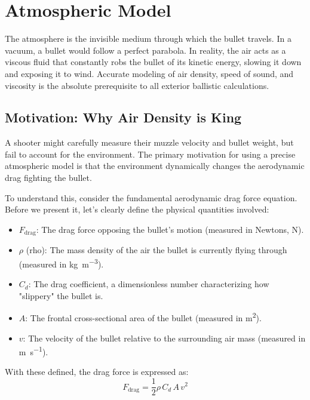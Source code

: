 \documentclass[11pt,twoside,openright]{report}
\begin{document}
\chapter{Atmospheric Model}
\label{ch:atmosphere}

The atmosphere is the invisible medium through which the bullet travels. In a vacuum, a bullet would follow a perfect parabola. In reality, the air acts as a viscous fluid that constantly robs the bullet of its kinetic energy, slowing it down and exposing it to wind. Accurate modeling of air density, speed of sound, and viscosity is the absolute prerequisite to all exterior ballistic calculations.

\section{Motivation: Why Air Density is King}

A shooter might carefully measure their muzzle velocity and bullet weight, but fail to account for the environment. The primary motivation for using a precise atmospheric model is that the environment dynamically changes the aerodynamic drag fighting the bullet. 

To understand this, consider the fundamental aerodynamic drag force equation. Before we present it, let's clearly define the physical quantities involved:
\begin{itemize}[noitemsep]
    \item $F_{\text{drag}}$: The drag force opposing the bullet's motion (measured in Newtons, \si{\newton}).
    \item $\rho$ (rho): The mass density of the air the bullet is currently flying through (measured in \si{\kilogram\per\meter\cubed}).
    \item $C_d$: The drag coefficient, a dimensionless number characterizing how "slippery" the bullet is.
    \item $A$: The frontal cross-sectional area of the bullet (measured in \si{\meter\squared}).
    \item $v$: The velocity of the bullet relative to the surrounding air mass (measured in \si{\meter\per\second}).
\end{itemize}

With these defined, the drag force is expressed as:
\begin{equation}
  F_{\text{drag}} = \frac{1}{2} \rho \, C_d \, A \, v^2
  \label{eq:drag_motivation}
\end{equation}
\end{document}
